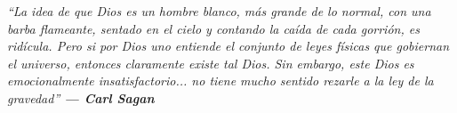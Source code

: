 \documentclass[10pt]{article}
\newenvironment{extraer}[1]{}{}
\begin{document}
	\noindent
	\begin{tcolorbox}[saganStyle, width=\textwidth]
		\begin{justify}{\fontsize{7.0pt}{8.2pt}\selectfont\color{textgray}\itshape
				\begin{extraer}{sagan_quote}\enquote{La idea de que Dios es un hombre blanco, más grande de lo normal, con una barba flameante, sentado en el cielo y contando la caída de cada gorrión, es ridícula. Pero si por Dios uno entiende el conjunto de leyes físicas que gobiernan el universo, entonces claramente existe tal Dios. Sin embargo, este Dios es emocionalmente insatisfactorio... no tiene mucho sentido rezarle a la ley de la gravedad}
				\end{extraer}
				\hfill{\small\upshape\color{golddark}\bfseries — Carl Sagan}
		}\end{justify}
	\end{tcolorbox}
	
	\vspace{0.04cm}
	
\end{document}
